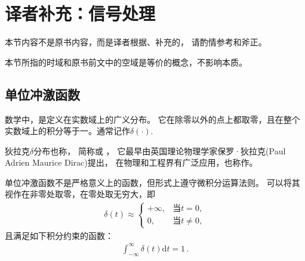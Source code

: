 \section{译者补充：信号处理}\label{sec:译者补充：信号处理}
\begin{remark}
    本节内容不是原书内容，而是译者根据\citet{enwiki:1115652231,enwiki:1115414995,
        enwiki:1098200554,enwiki:1114206769}、\citet{DigitalSignalProcessing}补充的，
    请酌情参考和斧正。
\end{remark}
\begin{notation}
    本节所指的时域和原书前文中的空域是等价的概念，不影响本质。
\end{notation}
\subsection{单位冲激函数}\label{sub:单位冲激函数}
\begin{definition}
    数学中，是定义在实数域上的广义分布。
    它在除零以外的点上都取零，且在整个实数域上的积分等于一。通常记作$\delta(\cdot)$.
\end{definition}

狄拉克$\delta$分布也称，
简称或
，
它最早由英国理论物理学家保罗·狄拉克(Paul Adrien Maurice Dirac)提出，
在物理和工程界有广泛应用，也称作。

单位冲激函数不是严格意义上的函数，但形式上遵守微积分运算法则。
可以将其视作在非零处取零，在零处取无穷大，即
\begin{align}
    \delta(t)\approx\left\{
    \begin{array}{ll}
        +\infty, & \text{当}t=0,     \\
        0,       & \text{当}t\neq 0,
    \end{array}
    \right.
\end{align}
且满足如下积分约束的函数：
\begin{align}
    \int_{-\infty}^{\infty}\delta(t)\mathrm{d}t=1\, .
\end{align}

